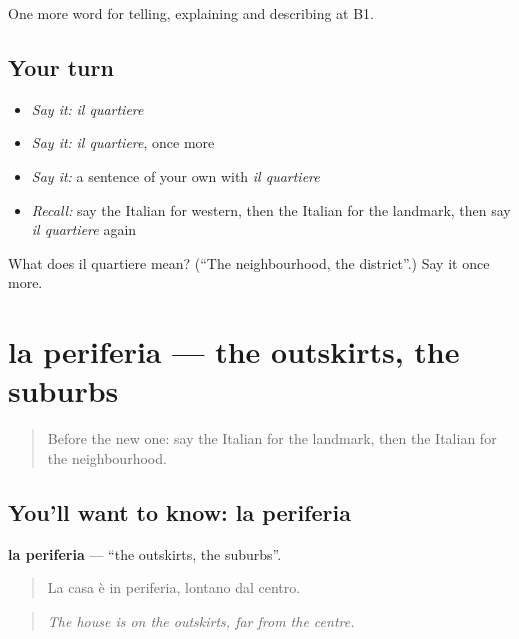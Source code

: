 \begin{grammarlens}[title={What you've built}]
One more word for telling, explaining and describing at B1.
\end{grammarlens}

\subsection*{Your turn}
\begin{itemize}
\raggedright
  \item \emph{Say it:} \emph{il quartiere}
  \item \emph{Say it:} \emph{il quartiere}, once more
  \item \emph{Say it:} a sentence of your own with \emph{il quartiere}
  \item \emph{Recall:} say the Italian for western, then the Italian for the landmark, then say \emph{il quartiere} again
\end{itemize}

\begin{tcolorbox}[breakable,colback=teal!4,colframe=teal!35!black,title={Before you move on}]
What does il quartiere mean? (\textquotedblleft{}The neighbourhood, the district\textquotedblright{}.) Say it once more.
\end{tcolorbox}
\section[la periferia]{la periferia — the outskirts, the suburbs}

\label{lesson:IT-C444-periferia}



\begin{quote}
Before the new one: say the Italian for the landmark, then the Italian for the neighbourhood.
\end{quote}

\subsection*{You'll want to know: la periferia}
\textbf{la periferia} — \textquotedblleft{}the outskirts, the suburbs\textquotedblright{}.

\begin{quote}
La casa è in periferia, lontano dal centro.
\end{quote}

\begin{quote}
\emph{The house is on the outskirts, far from the centre.}
\end{quote}


